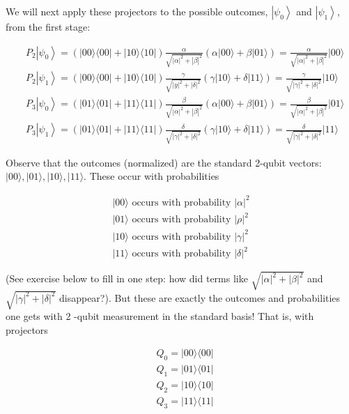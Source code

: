 \documentclass[main.tex]{subfiles}
\begin{document}
    We will next apply these projectors to the possible outcomes, $\left|\psi_{0}\right\rangle$ and $\left|\psi_{1}\right\rangle$, from the first stage:
    
    $$
    \begin{aligned}
    &P_{2}\left|\psi_{0}\right\rangle=(|00\rangle\langle 00|+| 10\rangle\langle 10|) \frac{\alpha}{\sqrt{|\alpha|^{2}+|\beta|^{2}}}(\alpha|00\rangle+\beta|01\rangle)=\frac{\alpha}{\sqrt{|\alpha|^{2}+|\beta|^{2}}}|00\rangle \\
    &P_{2}\left|\psi_{1}\right\rangle=(|00\rangle\langle 00|+| 10\rangle\langle 10|) \frac{\gamma}{\sqrt{|y|^{2}+|\delta|^{2}}}(\gamma|10\rangle+\delta|11\rangle)=\frac{\gamma}{\sqrt{|\gamma|^{2}+|\delta|^{2}}}|10\rangle \\
    &P_{3}\left|\psi_{0}\right\rangle=(|01\rangle\langle 01|+| 11\rangle\langle 11|) \frac{\beta}{\sqrt{|\alpha|^{2}+|\beta|^{2}}}(\alpha|00\rangle+\beta|01\rangle)=\frac{\beta}{\sqrt{|\alpha|^{2}+|\beta|^{2}}}|01\rangle \\
    &P_{3}\left|\psi_{1}\right\rangle=(|01\rangle\langle 01|+| 11\rangle\langle 11|) \frac{\delta}{\sqrt{|\gamma|^{2}+|\delta|^{2}}}(\gamma|10\rangle+\delta|11\rangle)=\frac{\delta}{\sqrt{|\gamma|^{2}+|\delta|^{2}}}|11\rangle
    \end{aligned}
    $$
    
    Observe that the outcomes (normalized) are the standard 2-qubit vectors: $|00\rangle,|01\rangle,|10\rangle,|11\rangle$. These occur with probabilities
    
    $$
    \begin{aligned}
    |00\rangle \text { occurs with probability } |\alpha|^{2}\\
    |01\rangle \text{ occurs with probability } |\rho|^{2}\\
    |10\rangle \text{ occurs with probability } |\gamma|^{2}\\
    |11\rangle \text{ occurs with probability } |\delta|^{2}
    \end{aligned}
    $$
    
    (See exercise below to fill in one step: how did terms like $\sqrt{|\alpha|^{2}+|\beta|^{2}}$ and $\sqrt{|\gamma|^{2}+|\delta|^{2}}$ disappear?). But these are exactly the outcomes and probabilities one gets with 2 -qubit measurement in the standard basis! That is, with projectors
    
    $$
    \begin{aligned}
    &Q_{0}=|00\rangle\langle 00| \\
    &Q_{1}=|01\rangle\langle 01| \\
    &Q_{2}=|10\rangle\langle 10| \\
    &Q_{3}=|11\rangle\langle 11|
    \end{aligned}
    $$
    
\end{document}
